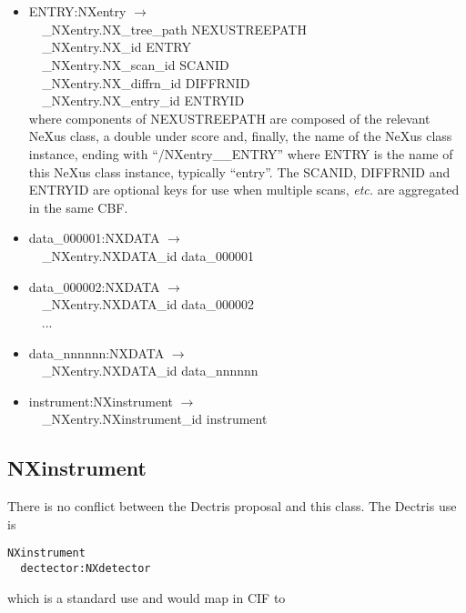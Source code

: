 \documentclass[11pt]{article}
\begin{document}
{{\begin{itemize}

\item{ENTRY:NXentry $\rightarrow$\\
\verb|  |\_NXentry.NX\_tree\_path    NEXUSTREEPATH \\
\verb|  |\_NXentry.NX\_id            ENTRY \\
\verb|  |\_NXentry.NX\_scan\_id      SCANID \\
\verb|  |\_NXentry.NX\_diffrn\_id    DIFFRNID \\
\verb|  |\_NXentry.NX\_entry\_id     ENTRYID \\
where components of NEXUSTREEPATH are composed of the
relevant NeXus class, a double under score and, finally, the
name of the NeXus class instance, ending with ``/NXentry\_\_ENTRY''
where ENTRY is the name of this NeXus class instance, typically ``entry''.
The SCANID, DIFFRNID and ENTRYID are optional keys for use
when multiple scans, {\it etc.} are aggregated in the same CBF.}

\item{data\_000001:NXDATA $\rightarrow$\\
\verb|  |\_NXentry.NXDATA\_id data\_000001}

\item{data\_000002:NXDATA $\rightarrow$\\
\verb|  |\_NXentry.NXDATA\_id data\_000002}
\\
~~...
\item{data\_nnnnnn:NXDATA $\rightarrow$\\
\verb|  |\_NXentry.NXDATA\_id data\_nnnnnn}

\item{instrument:NXinstrument $\rightarrow$\\
\verb|  |\_NXentry.NXinstrument\_id instrument}
\end{itemize}


\subsection{NXinstrument}

There is no conflict between the Dectris proposal and this class.  
The Dectris use is 


\begin{verbatim}
NXinstrument
  dectector:NXdetector
\end{verbatim}

which is a standard use and would map in CIF to 

}}
\end{document}
